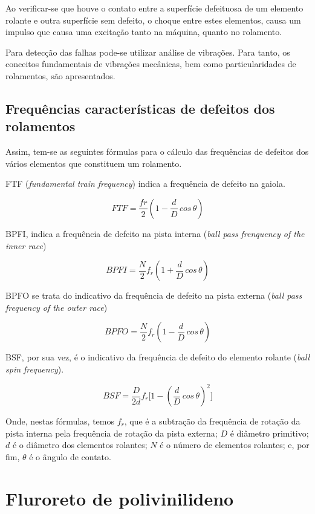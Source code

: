 \documentclass[
	12pt,				
	oneside,			
	a4paper,			
	english,			
	brazil				
	]{abntex2ppgsi}
\begin{document}
Ao verificar-se que houve o contato entre a superfície defeituosa de um elemento rolante e outra superfície sem defeito, o choque entre estes elementos, causa um impulso que causa uma excitação tanto na máquina, quanto no rolamento. 

Para detecção das falhas pode-se utilizar análise de vibrações. Para tanto, os conceitos fundamentais de vibrações mecânicas, bem como particularidades de rolamentos, são apresentados.


\subsection{\textbf{Frequências características de defeitos dos rolamentos}}

Assim, tem-se as seguintes fórmulas para o cálculo das frequências de defeitos dos vários  elementos que constituem um rolamento. 

FTF (\textit{fundamental train frequency}) indica a frequência de defeito na gaiola. 

\[FTF = \frac{fr}{2} \left ( 1 - \frac{d}{D} \,cos \, \theta \right )  \]

BPFI, indica a frequência de defeito na pista interna (\textit{ball pass frenquency of the inner race})

\[BPFI = \frac{N}{2}f_{r} \left ( 1 + \frac{d}{D} \,cos \, \theta \right )  \]

BPFO se trata do indicativo da frequência de defeito na pista externa (\textit{ball pass frequency of the outer race})

\[BPFO = \frac{N}{2}f_{r} \left ( 1 - \frac{d}{D} \,cos \, \theta \right )  \]

BSF, por sua vez, é o indicativo da frequência de defeito do elemento rolante (\textit{ball spin frequency}).

\[BSF = \frac{D}{2d}f_{r} \Bigg[  1 - \left ( \frac{d}{D} \,cos \, \theta \right ) ^{2}  \Bigg] \]

Onde, nestas fórmulas, temos $f_{r}$, que é a subtração da frequência de rotação da pista interna pela frequência de rotação da pista externa; $D$ é diâmetro primitivo; $d$ é o diâmetro dos elementos rolantes; $N$ é o número de elementos rolantes; e, por fim, $\theta$ é o ângulo de contato.


\section{\textbf{Fluroreto de polivinilideno}}
\end{document}
